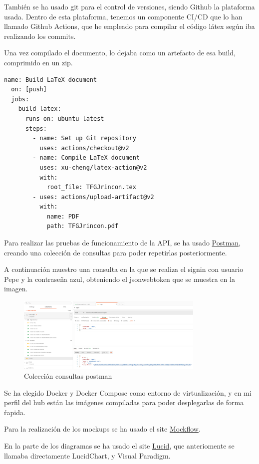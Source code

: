 \documentclass[11pt,spanish,listoffigures,listoftables]{tfgetsinf}
\begin{document}
También se ha usado git para el control de versiones, siendo Github la plataforma usada. Dentro de esta plataforma, tenemos un componente CI/CD que lo han llamado Github Actions, que he empleado para compilar el código látex según iba realizando los commits.

Una vez compilado el documento, lo dejaba como un artefacto de esa build, comprimido en un zip. 

\begin{lstlisting}[style=ES6, caption={Configuración action github}]
  name: Build LaTeX document
  on: [push]
  jobs:
    build_latex:
      runs-on: ubuntu-latest
      steps:
        - name: Set up Git repository
          uses: actions/checkout@v2
        - name: Compile LaTeX document
          uses: xu-cheng/latex-action@v2
          with:
            root_file: TFGJrincon.tex
        - uses: actions/upload-artifact@v2
          with:
            name: PDF
            path: TFGJrincon.pdf
\end{lstlisting}
\clearpage
Para realizar las pruebas de funcionamiento de la API, se ha usado \href{https://www.postman.com/}{Postman}, creando una colección de consultas para poder repetirlas posteriormente.

A continuación muestro una consulta en la que se realiza el signin con usuario Pepe y la contraseña azul, obteniendo el jsonwebtoken que se muestra en la imagen.

\begin{figure}[h!] %
  \centering
   \includegraphics[width=0.80\textwidth]{img/postman.png}
   \caption{Colección consultas postman}
   \label{fig:postman}
 \end{figure}

Se ha elegido Docker y Docker Compose como entorno de virtualización, y en mi perfil del hub están las imágenes compiladas para poder desplegarlas de forma ŕapida. 

Para la realización de los mockups se ha usado el site \href{https://mockflow.com/app/#Wireframe}{Mockflow}.

En la parte de los diagramas se ha usado el site \href{https://lucid.app/}{Lucid}, que anteriomente se llamaba directamente LucidChart, y Visual Paradigm.
\end{document}
